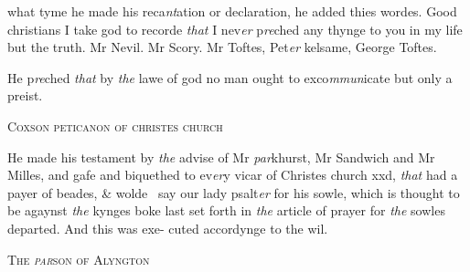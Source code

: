 \documentclass[12pt, a4paper]{book}
\begin{document}
 
 	
				\marginpar[\vspace{0.5cm}{\textcolor{Gray}{n}}]{}
			
 	
		\ifthenelse{\isodd{\thepage}}
		{\reversemarginpar}
		{\normalmarginpar}
		what tyme he made his reca\textit{nt}ation or declaration, he
 added thies wordes. Good christians I take god to recorde
 \textit{that} I nev\textit{er} p\textit{re}ched any thynge to you in my life but the
 		truth. Mr Nevil. Mr Scory. Mr Toftes, Pet\textit{er }kelsame,
 George Toftes.
 	
		\ifthenelse{\isodd{\thepage}}
		{\reversemarginpar}
		{\normalmarginpar}
		He p\textit{re}ched \textit{that} by \textit{the} lawe of god no man ought to exco\textit{mmun}icate
 		but only a preist.
 

            
               
				\begin{center} \begin{large} {\scshape Coxson peticanon of christes church} \end{large} \end{center}
			

            	
            		
				\marginpar[\vspace{0.5cm}{\textcolor{Gray}{+}}]{}
			
            		
				\marginpar[\vspace{0.5cm}{\textcolor{Gray}{n}}]{}
			
            		
		\ifthenelse{\isodd{\thepage}}
		{\reversemarginpar}
		{\normalmarginpar}
		He made his testament by \textit{the} advise of Mr \textit{par}khurst, Mr
            			Sandwich and Mr Milles, and gafe and biquethed to ev\textit{er}y vicar
 of Christes church xxd, \textit{that} had a payer of beades, \& wolde 
say our lady psalt\textit{er} for his sowle, which is thought
 to be agaynst \textit{the} kynges boke last set forth in \textit{the} article
 of prayer for \textit{the} sowles departed. And this was exe-
 cuted accordynge to the wil.
 

            
               
				\begin{center} \begin{large} {\scshape The \textit{par}son of Alyngton} \end{large} \end{center}
			
               
               	
			
\end{document}
